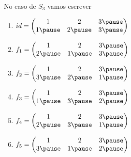 \documentclass{beamer}
\begin{document}
    \begin{frame}
        No caso de $S_3$ vamos escrever\pause
        \begin{multicols}{3}
            \begin{enumerate}
                \item[] $id = \begin{pmatrix}
                    1 & 2 & 3\pause\\
                    1 \pause & 2 \pause & 3\pause
                \end{pmatrix}$\pause

                \vspace{.5cm}

                \item[] $f_1 = \begin{pmatrix}
                    1 & 2 & 3 \pause\\
                    2 \pause & 1 \pause & 3 \pause
                \end{pmatrix}$\pause

                \vspace{.5cm}

                \item[] $f_2 = \begin{pmatrix}
                    1 & 2 & 3 \pause\\
                    3 \pause & 2 \pause & 1 \pause
                \end{pmatrix}$\pause

                \vspace{.5cm}

                \item[] $f_3 = \begin{pmatrix}
                    1 & 2 & 3 \pause\\
                    1 \pause & 3 \pause & 2 \pause
                \end{pmatrix}$\pause

                \vspace{.5cm}

                \item[] $f_4 = \begin{pmatrix}
                    1 & 2 & 3 \pause\\
                    2 \pause & 3 \pause & 1 \pause
                \end{pmatrix}$\pause

                \vspace{.5cm}

                \item[] $f_5 = \begin{pmatrix}
                    1 & 2 & 3 \pause\\
                    3 \pause & 1 \pause & 2 \pause
                \end{pmatrix}$\pause
            \end{enumerate}
        \end{multicols}
    \end{frame}
\end{document}
